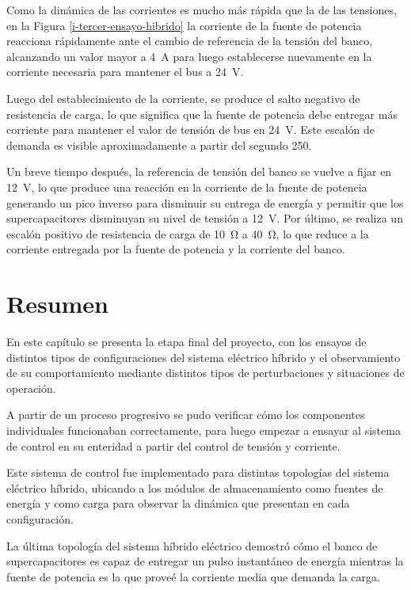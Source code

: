 Como la dinámica de las corrientes es mucho más rápida que la de las tensiones, en la Figura \ref{i-tercer-ensayo-hibrido} la corriente de la fuente de potencia reacciona rápidamente ante el cambio de referencia de la tensión del banco, alcanzando un valor mayor a \SI{4}{\ampere} para luego establecerse nuevamente en la corriente necesaria para mantener el bus a \SI{24}{\volt}.

Luego del establecimiento de la corriente, se produce el salto negativo de resistencia de carga, lo que significa que la fuente de potencia debe entregar más corriente para mantener el valor de tensión de bus en \SI{24}{\volt}. Este escalón de demanda es visible aproximadamente a partir del segundo 250. 

Un breve tiempo después, la referencia de tensión del banco se vuelve a fijar en \SI{12}{\volt}, lo que produce una reacción en la corriente de la fuente de potencia generando un pico inverso para disminuir su entrega de energía y permitir que los supercapacitores disminuyan su nivel de tensión a \SI{12}{\volt}. Por último, se realiza un escalón positivo de resistencia de carga de \SI{10}{\ohm} a \SI{40}{\ohm}, lo que reduce a la corriente entregada por la fuente de potencia y la corriente del banco.


\section{Resumen}

En este capítulo se presenta la etapa final del proyecto, con los ensayos de distintos tipos de configuraciones del sistema eléctrico híbrido y el observamiento de su comportamiento mediante distintos tipos de perturbaciones y situaciones de operación. 

A partir de un proceso progresivo se pudo verificar cómo los componentes individuales funcionaban correctamente, para luego empezar a ensayar al sistema de control en su enteridad a partir del control de tensión y corriente.

Este sistema de control fue implementado para distintas topologías del sistema eléctrico híbrido, ubicando a los módulos de almacenamiento como fuentes de energía y como carga para observar la dinámica que presentan en cada configuración.

La última topología del sistema híbrido eléctrico demostró cómo el banco de supercapacitores es capaz de entregar un pulso instantáneo de energía mientras la fuente de potencia es la que proveé la corriente media que demanda la carga.

\newpage